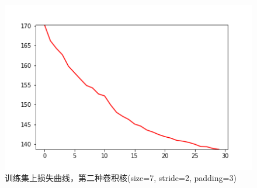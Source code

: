 \documentclass{article}
\begin{document}
\begin{figure}[!ht]
	\centering %
	\includegraphics[scale=0.5]{runing-loss-11.png}
	\caption{训练集上损失曲线，第二种卷积核(size=7, stride=2, padding=3)}
\end{figure}
\end{document}
